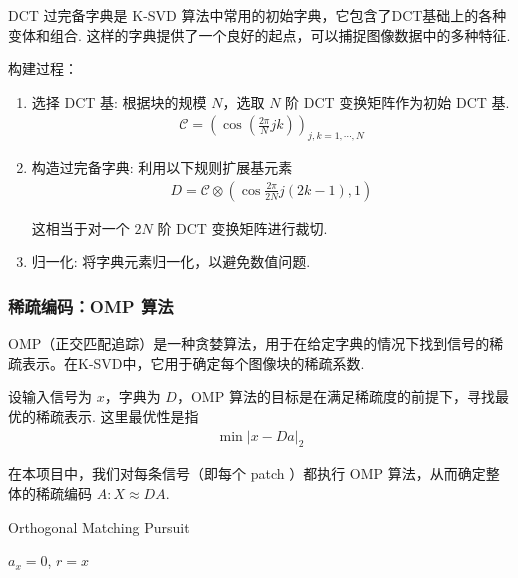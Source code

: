 \documentclass[10.5pt]{myarticle}
\begin{document}
DCT 过完备字典是 K-SVD 算法中常用的初始字典，它包含了DCT基础上的各种变体和组合. 这样的字典提供了一个良好的起点，可以捕捉图像数据中的多种特征.

构建过程：
\begin{enumerate}
	\item 选择 DCT 基: 根据块的规模 $N$，选取 $N$ 阶 DCT 变换矩阵作为初始 DCT 基. 
	\begin{align*}
		\mathcal{C} = \left( \cos \left(\frac{2\pi}{N} jk\right) \right)_{j, k = 1, \cdots, N}
	\end{align*}
	
	\item 构造过完备字典: 利用以下规则扩展基元素
	\begin{align*}
		D = \mathcal{C} \otimes \left( \cos \frac{2\pi}{2N} j(2k-1), 1 \right)
	\end{align*}
	
	这相当于对一个 $2N$ 阶 DCT 变换矩阵进行裁切. 
	\item 归一化: 将字典元素归一化，以避免数值问题. 
\end{enumerate}

\subsubsection{稀疏编码：OMP 算法}
OMP（正交匹配追踪）是一种贪婪算法，用于在给定字典的情况下找到信号的稀疏表示。在K-SVD中，它用于确定每个图像块的稀疏系数. 

设输入信号为 $x$，字典为 $D$，OMP 算法的目标是在满足稀疏度的前提下，寻找最优的稀疏表示. 这里最优性是指
\begin{align}
	\min |x - Da|_2
\end{align}

在本项目中，我们对每条信号（即每个 patch ）都执行 OMP 算法，从而确定整体的稀疏编码 $A: X \approx DA$. 

\begin{algorithm}[H]
	\caption{Orthogonal Matching Pursuit}
	\label{alg:omp}
	
	
	$a_x = 0$, $r = x$ 
\end{algorithm}
\end{document}
